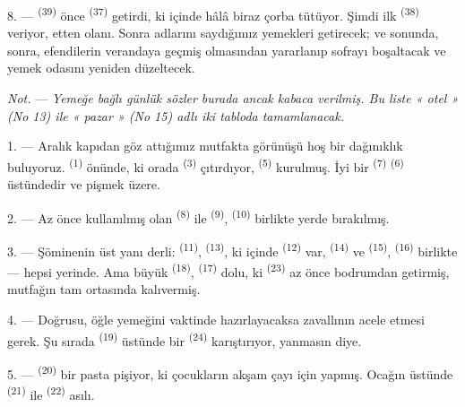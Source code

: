 8. ---  \textsuperscript{(39)} önce 
\textsuperscript{(37)} getirdi, ki içinde hâlâ biraz çorba tütüyor. Şimdi ilk
 \textsuperscript{(38)} veriyor, etten olanı. Sonra adlarını
saydığımız yemekleri getirecek; ve sonunda,  sonra,
efendilerin verandaya geçmiş olmasından yararlanıp sofrayı boşaltacak ve yemek
odasını yeniden düzeltecek.

\textit{Not.} --- \textit{Yemeğe bağlı günlük sözler burada ancak kabaca
verilmiş. Bu liste « otel » (No 13) ile « pazar » (No 15) adlı iki tabloda
tamamlanacak.}

\VUsaut{4.6mm}
\VUsaut{3.0mm}

1. --- Aralık kapıdan göz attığımız mutfakta görünüşü hoş bir dağınıklık
buluyoruz.  \textsuperscript{(1)} önünde, ki orada
 \textsuperscript{(3)} çıtırdıyor, 
\textsuperscript{(5)} kurulmuş. İyi bir 
\textsuperscript{(7)}  \textsuperscript{(6)} üstündedir ve
pişmek üzere.

2. --- Az önce kullanılmış olan  \textsuperscript{(8)} ile
 \textsuperscript{(9)}, 
\textsuperscript{(10)} birlikte yerde bırakılmış.

3. --- Şöminenin üst yanı derli:  \textsuperscript{(11)},
 \textsuperscript{(13)}, ki içinde 
\textsuperscript{(12)} var,  \textsuperscript{(14)} ve
 \textsuperscript{(15)}, 
\textsuperscript{(16)} birlikte --- hepsi yerinde. Ama büyük
 \textsuperscript{(18)}, 
\textsuperscript{(17)} dolu, ki  \textsuperscript{(23)} az
önce bodrumdan getirmiş, mutfağın tam ortasında kalıvermiş.

4. --- Doğrusu, öğle yemeğini vaktinde hazırlayacaksa zavallının acele etmesi
gerek. Şu sırada  \textsuperscript{(19)} üstünde bir
 \textsuperscript{(24)} karıştırıyor, yanmasın diye.

5. ---  \textsuperscript{(20)} bir pasta pişiyor, ki çocukların
akşam çayı için yapmış. Ocağın üstünde  \textsuperscript{(21)}
ile  \textsuperscript{(22)} asılı.

